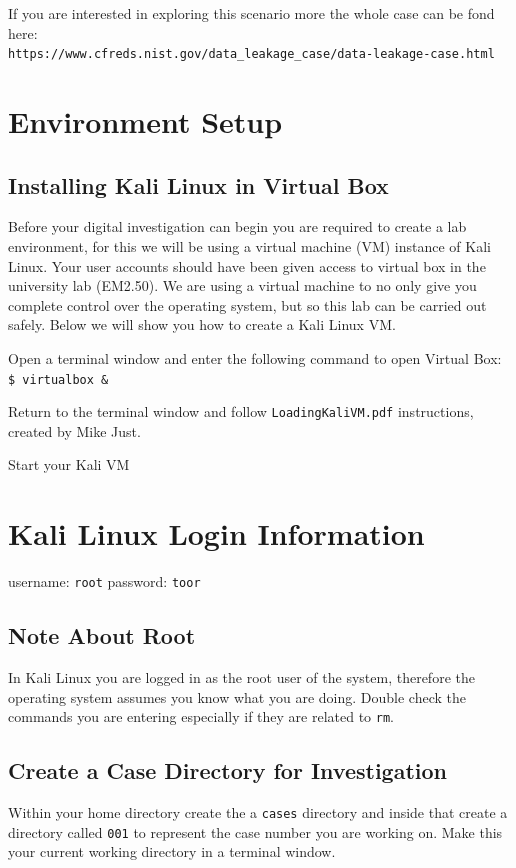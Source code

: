 \documentclass[a4paper,11pt]{article}
\begin{document}
 If you are interested in exploring this scenario more the whole case can be fond here:\\
 \verb|https://www.cfreds.nist.gov/data_leakage_case/data-leakage-case.html|

\section{Environment Setup}
\subsection*{Installing Kali Linux in Virtual Box}
Before your digital investigation can begin you are required to create a lab environment, for this we will be using a virtual machine (VM) instance of Kali Linux.
Your user accounts should have been given access to virtual box in the university lab (EM2.50). We are using a virtual machine to no only give you complete control over the operating system, but so this lab can be carried out safely. Below we will show you how to create a Kali Linux VM.
	\begin{enumerate*}
	 \item Open a terminal window and enter the following command to open Virtual Box:\\
		\texttt{{\$}	virtualbox {\&}}
	\item Return to the terminal window and follow \texttt{LoadingKaliVM.pdf} instructions, created by Mike Just.
	\item Start your Kali VM
	\end{enumerate*}
	
\section{Kali Linux Login Information}
	 username: \texttt{root}
	 password: \texttt{toor}

\subsection{Note About Root}
In Kali Linux you are logged in as the root user of the system, therefore the operating system assumes you know what you are doing. Double check the commands you are entering especially if they are related to \texttt{rm}.

\subsection{Create a Case Directory for Investigation}
Within your home directory create the a \texttt{cases} directory and inside that create a directory called \texttt{001} to represent the case number you are working on. Make this your current working directory in a terminal window.
\end{document}
